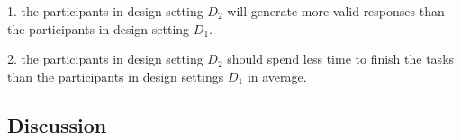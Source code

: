 1. the participants in design setting $D_2$ will generate more valid responses than the participants in design setting $D_1$.

2. the participants in design setting $D_2$ should spend less time to finish the tasks than the participants in design settings $D_1$ in average.

\subsection{Discussion}





 

